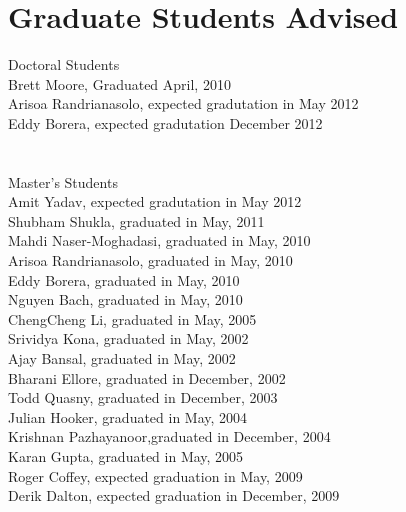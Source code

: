 \documentclass[10pt]{resume}
\begin{document}
\section{Graduate Students Advised}{Doctoral Students}
{
\\Brett Moore, Graduated April, 2010\\
  Arisoa Randrianasolo, expected gradutation in May 2012\\
  Eddy Borera, expected gradutation December 2012\\
 }

\section{}{Master's Students}
{\\Amit Yadav, expected gradutation in May 2012\\
  Shubham Shukla, graduated in May, 2011\\
  Mahdi Naser-Moghadasi, graduated in May, 2010\\
  Arisoa Randrianasolo, graduated in May, 2010\\
  Eddy Borera, graduated in  May, 2010\\
  Nguyen Bach, graduated in  May, 2010\\
  ChengCheng Li, graduated in May, 2005\\
  Srividya Kona, graduated in May, 2002\\
  Ajay Bansal, graduated in May, 2002\\
  Bharani Ellore, graduated in December, 2002\\
  Todd Quasny, graduated in December, 2003\\
  Julian Hooker, graduated in May, 2004\\
  Krishnan Pazhayanoor,graduated in December, 2004\\
  Karan Gupta, graduated in May, 2005\\
  Roger Coffey, expected graduation in May, 2009\\
  Derik Dalton, expected graduation in December, 2009\\
}


\end{document}
